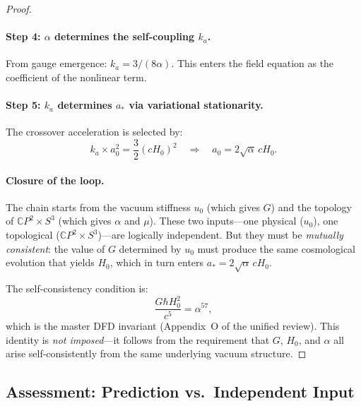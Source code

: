 \documentclass[11pt]{article}
\begin{document}
\begin{proof}
\paragraph{Step 4: $\alpha$ determines the self-coupling $k_a$.}
From gauge emergence: $k_a = 3/(8\alpha)$.  This enters the field
equation as the coefficient of the nonlinear term.

\paragraph{Step 5: $k_a$ determines $a_*$ via variational stationarity.}
The crossover acceleration is selected by:
\begin{equation}
k_a\times a_0^2 = \frac{3}{2}(cH_0)^2
\quad\Longrightarrow\quad
a_0 = 2\sqrt{\alpha}\,cH_0.
\end{equation}

\paragraph{Closure of the loop.}
The chain starts from the vacuum stiffness $u_0$ (which gives $G$)
and the topology of $\mathbb{C}P^2\times S^3$ (which gives $\alpha$
and $\mu$).  These two inputs---one physical ($u_0$), one topological
($\mathbb{C}P^2\times S^3$)---are logically independent.  But they
must be \emph{mutually consistent}: the value of $G$ determined by $u_0$
must produce the same cosmological evolution that yields $H_0$, which
in turn enters $a_* = 2\sqrt{\alpha}\,cH_0$.

The self-consistency condition is:
\begin{equation}
\frac{G\hbar H_0^2}{c^5} = \alpha^{57},
\end{equation}
which is the master DFD invariant (Appendix~O of the unified review).
This identity is \emph{not imposed}---it follows from the requirement
that $G$, $H_0$, and $\alpha$ all arise self-consistently from the
same underlying vacuum structure.
\end{proof}

\subsection{Assessment: Prediction vs.\ Independent Input}
\end{document}
